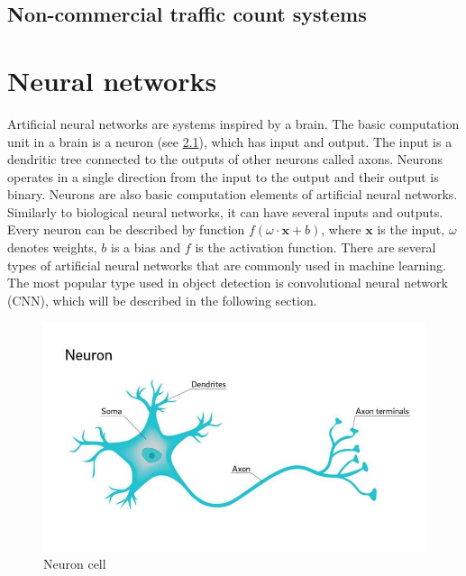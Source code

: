 \documentclass[twoside]{ctuthesis}
\theoremstyle{plain}
\theoremstyle{definition}
\theoremstyle{note}
\begin{document}
\section{Non-commercial traffic count systems}


\label{chapter:related_works}
\chapter{Neural networks}
\label{chapter:neural_networks}
Artificial neural networks are systems inspired by a brain.     The basic computation unit in a brain is a neuron (see \ref{neuron}), which has input and output. The input is a dendritic tree connected to the outputs of other neurons called axons. Neurons operates in a single direction from the input to the output and their output is binary.  
Neurons are also basic computation elements of artificial neural networks. Similarly to biological neural networks, it can have several inputs and outputs. Every neuron can be described by function $f\left(\omega \cdot \textbf{x}  + b\right)$, where $\textbf{x}$ is the input, $\omega$ denotes weights, $b$ is a bias and $f$ is the activation function. 
There are several types of artificial neural networks that are commonly used in machine learning. The most popular type used in object detection is convolutional neural network (CNN), which will be described in the following section.
\begin{figure}[h]
\caption{Neuron cell\cite{staff_2018}}
\label{neuron}
\includegraphics[width=\textwidth]{images/neural_networks/2-whyareneuron.jpg}
\end{figure}
\end{document}
